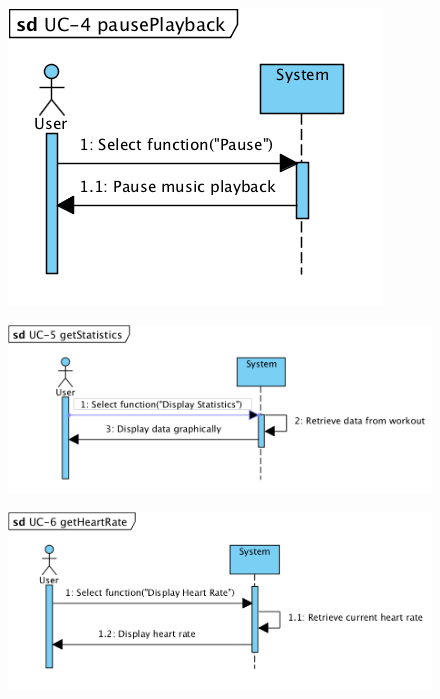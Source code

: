 \documentclass[letterpaper,english, 12pt]{scrreprt}
\begin{document}
\begin{figure}[H]
        \centering
        \includegraphics[width=\textwidth]{img/ssd/ssd_uc4.png}\\
\end{figure}

\begin{figure}[H]
        \centering
        \includegraphics[width=\textwidth]{img/ssd/ssd_uc5.png}\\
\end{figure}

\begin{figure}[H]
        \centering
        \includegraphics[width=\textwidth]{img/ssd/ssd_uc6.png}\\
\end{figure}
\end{document}
